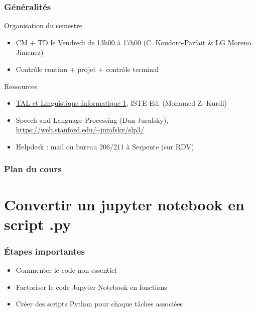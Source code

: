 \begin{frame}
  \frametitle{Généralités}
  \begin{block}{Organisation du semestre}
 \begin{itemize}
   \item CM + TD le Vendredi de 13h00 à 17h00 (C. Koudoro-Parfait \& LG Moreno Jimenez)
   \item Contrôle continu + projet + contrôle terminal
  
  \end{itemize}
  \end{block}
\begin{block}{Ressources}
  \begin{itemize}
  \item \href{http://paris-sorbonne.hosted.exlibrisgroup.com/F?func=find-c&ccl_term=idn=ppn199563403&local_base=MAH01}{TAL et Linguistique Informatique 1}, ISTE Ed. (Mohamed Z. Kurdi) 
  \item Speech and Language Processing (Dan Jurafsky), \url{https://web.stanford.edu/~jurafsky/slp3/} 
  \item Helpdesk : mail ou bureau 206/211 à Serpente (sur RDV)
  \end{itemize}
   \end{block}
\end{frame}

\begin{frame}
  \frametitle{Plan du cours}
\tableofcontents

\end{frame}
\section{Convertir un jupyter notebook en script .py}


\begin{frame}
 \frametitle{Étapes importantes}
\begin{itemize}

\item \textcolor{green}{} Commenter le code non essentiel 

\item \textcolor{green}{} Factoriser le code Jupyter Notebook en fonctions

\item \textcolor{green}{} Créer des scripts Python pour chaque tâches associées

\end{itemize} 
\end{frame}

